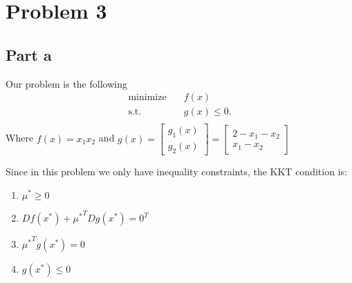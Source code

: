 \documentclass{article}
\begin{document}
\section*{Problem 3}
\subsection*{Part a}
Our problem is the following
\[
\begin{aligned}
\text{minimize}\quad & f(x)\\
\textrm{s.t.} \quad &g(x)\leq 0.\\
\end{aligned}
\]
Where $f(x)=x_1x_2$ and $g(x)=\begin{bmatrix}
g_1(x)\\
g_2(x)
\end{bmatrix}=\begin{bmatrix}
2-x_1-x_2\\
x_1-x_2
\end{bmatrix}$

Since in this problem we only have inequality constraints, the KKT condition
is:
\begin{enumerate}[I]
\item $\mu^*\geq0$ \label{muPositive}
\item $Df(x^*)+{\mu^*}^TDg(x^*)=0^T$ \label{KKT}
\item ${\mu^*}^Tg(x^*)=0$ \label{muTg}
\item $g(x^*)\leq0$ \label{gNegative}
\end{enumerate}
\end{document}
